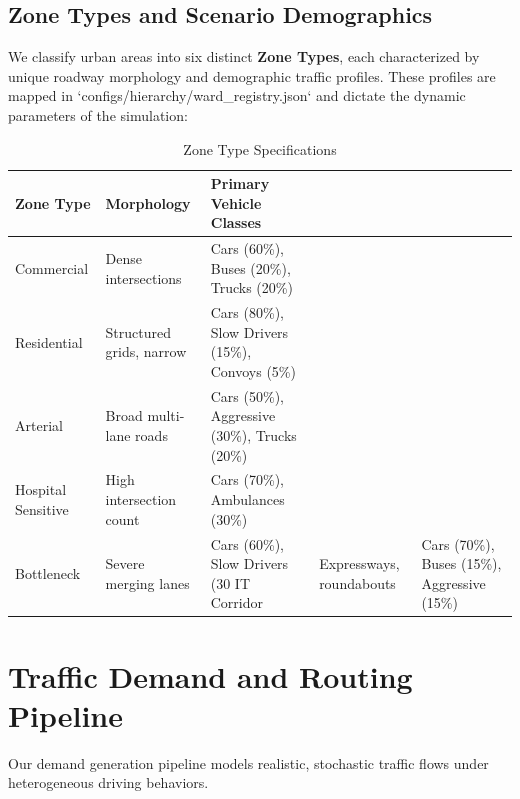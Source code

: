 \documentclass[conference]{IEEEtran}
\begin{document}
\subsection{Zone Types and Scenario Demographics}
We classify urban areas into six distinct \textbf{Zone Types}, each characterized by unique roadway morphology and demographic traffic profiles. These profiles are mapped in `configs/hierarchy/ward_registry.json` and dictate the dynamic parameters of the simulation:
\begin{table}[h]
\centering
\caption{Zone Type Specifications}
\label{tab:zone_types}
\begin{tabular}{@{}lll@{}}
\toprule
\textbf{Zone Type} & \textbf{Morphology} & \textbf{Primary Vehicle Classes} \\ \midrule
Commercial & Dense intersections & Cars (60\%), Buses (20\%), Trucks (20\%) \\
Residential & Structured grids, narrow & Cars (80\%), Slow Drivers (15\%), Convoys (5\%) \\
Arterial & Broad multi-lane roads & Cars (50\%), Aggressive (30\%), Trucks (20\%) \\
Hospital Sensitive & High intersection count & Cars (70\%), Ambulances (30\%) \\
Bottleneck & Severe merging lanes & Cars (60\%), Slow Drivers (30%
IT Corridor & Expressways, roundabouts & Cars (70\%), Buses (15\%), Aggressive (15\%) \\ \bottomrule
\end{tabular}
\end{table}

\section{Traffic Demand and Routing Pipeline}
Our demand generation pipeline models realistic, stochastic traffic flows under heterogeneous driving behaviors.
\end{document}
